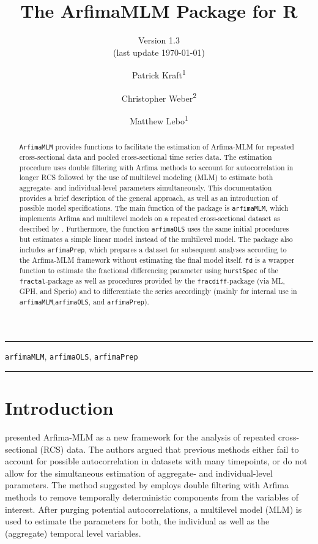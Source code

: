 \documentclass[12pt]{paper}\usepackage[]{graphicx}\usepackage[]{color}
\author{Patrick Kraft\textsuperscript{1} \and
Christopher Weber\textsuperscript{2} \and
Matthew Lebo\textsuperscript{1}}
\title{The ArfimaMLM Package for R}
\subtitle{Version 1.3\\\footnotesize{(last update \today)}}
\begin{document}
\pagestyle{fancy}

\fancyfoot[C]{\thepage} %

\maketitle

\hrule
\begin{abstract}
\texttt{ArfimaMLM} provides functions to facilitate the estimation of Arfima-MLM for repeated cross-sectional data and pooled cross-sectional time series data. The estimation procedure uses double filtering with Arfima methods to account for autocorrelation in longer RCS followed by the use of multilevel modeling (MLM) to estimate both aggregate- and individual-level parameters simultaneously. This documentation provides a brief description of the general approach, as well as an  introduction of possible model specifications. The main function of the package is \texttt{arfimaMLM}, which implements Arfima and multilevel models on a repeated cross-sectional dataset as described by \citet{lebo2015effective}. Furthermore, the function \texttt{arfimaOLS} uses the same initial procedures but estimates a simple linear model instead of the multilevel model. The package also includes \texttt{arfimaPrep}, which prepares a dataset for subsequent analyses according to the Arfima-MLM framework without estimating the final model itself. \texttt{fd} is a wrapper function to estimate the fractional differencing parameter using \texttt{hurstSpec} of the \texttt{fractal}-package as well as procedures provided by the \texttt{fracdiff}-package (via ML, GPH, and Sperio) and to differentiate the series accordingly (mainly for internal use in \texttt{arfimaMLM},\texttt{arfimaOLS}, and \texttt{arfimaPrep}).
\end{abstract}

\begin{keywords}
\texttt{arfimaMLM}, \texttt{arfimaOLS}, \texttt{arfimaPrep}
\end{keywords}
\hrule

\vfill
\newpage


\section{Introduction}

\citet{lebo2015effective} presented Arfima-MLM as a new framework for the analysis of repeated cross-sectional (RCS) data. The authors argued that previous methods either fail to account for possible autocorrelation in datasets with many timepoints, or do not allow for the simultaneous estimation of aggregate- and individual-level parameters. The method suggested by \citet{lebo2015effective} employs double filtering with Arfima methods to remove temporally deterministic components from the variables of interest. After purging potential autocorrelations, a multilevel model (MLM) is used to estimate the parameters for both, the individual as well as the (aggregate) temporal level variables.
\end{document}
